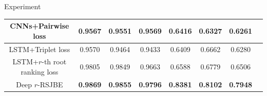 \documentclass[final]{beamer}
\newlength{\onecolwid}
\begin{document}
\begin{frame}[t]
\begin{columns}[t]
\begin{column}{\onecolwid}
\begin{block}{Experiment}
\begin{table}
{\begin{tabular}{|c|c|c|c|c|c|c|c|}
\hline\hline
CNNs+Pairwise loss   &   0.9567  & 0.9551  &  0.9569  &  0.6416  &  0.6327 & 0.6261 \\
\hline
LSTM+Triplet loss       &   0.9570 &  0.9464 & 0.9433   & 0.6409 &  0.6662 & 0.6280    \\

\hline\hline  
LSTM+$r$-th root ranking loss             &  0.9805  &  0.9849 &   0.9663 & 0.6588  &  0.6779 & 0.6506 \\ \hline
Deep $r$-RSJBE &  \textbf{0.9869} &
\textbf{0.9855}  &   \textbf{0.9796} & \textbf{0.8381}  & \textbf{0.8102} & \textbf{0.7948} 
\\
\hline

\end{tabular}
 \vspace{-2mm}
       }
\end{table}


\end{block}
\end{column}
\end{columns}
\end{frame}
\end{document}

